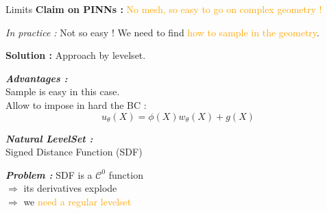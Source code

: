 \begin{frame}{Limits}
	\textbf{Claim on PINNs :} \textcolor{orange}{No mesh, so easy to go on complex geometry !}
	
	\warning \textit{In practice :} Not so easy ! We need to find \textcolor{orange}{how to sample in the geometry}.
	
	\vspace{8pt}
	
	\textbf{Solution :} Approach by levelset.
	
	\begin{center}
	\end{center}
	
	\vspace{5pt}

	\begin{center}
		\begin{minipage}{0.44\linewidth}
			\textbf{\textit{Advantages :}} \\
			 Sample is easy in this case. \\
			 Allow to impose in hard the BC :
			\vspace{-5pt}
			\begin{equation*}
				u_\theta(X)=\phi(X)w_\theta(X)+g(X)
			\end{equation*}
		\end{minipage}
		\begin{minipage}{0.44\linewidth}
			\textbf{\textit{Natural LevelSet :}} \\
			Signed Distance Function (SDF)
			
			\vspace{5pt}
			\textbf{\textit{Problem :}} SDF is a $\mathcal{C}^0$ function  \\
			$\Rightarrow$ its derivatives explode \\
			$\Rightarrow$ we \textcolor{orange}{need a regular levelset}
		\end{minipage}
	\end{center}
\end{frame}

